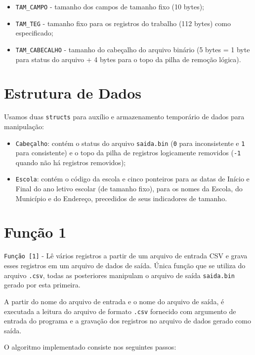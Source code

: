 \documentclass[
	12pt,				%
	openany,			%
	twoside,			%
	a4paper,			%
	english,			%
	french,				%
	spanish,			%
	brazil,				%
]{abntex2}
\begin{document}
		\begin{itemize}
			\item \verb|TAM_CAMPO| - tamanho dos campos de tamanho fixo (10 bytes);
			\item \verb|TAM_TEG| - tamanho fixo para os registros do trabalho (112 bytes) como especificado;
			\item \verb|TAM_CABECALHO| - tamanho do cabeçalho do arquivo binário (5 bytes = 1 byte para status do arquivo + 4 bytes para o topo da pilha de remoção lógica).
		\end{itemize}

	\section{Estrutura de Dados}

	Usamos duas \verb|structs| para auxílio e armazenamento temporário de dados para manipulação:

	\begin{itemize}
		\item  \verb|Cabeçalho|: contém  o status do arquivo \verb|saida.bin| (\verb|0| para inconsistente e \verb|1| para consistente) e o topo da pilha de registros logicamente removidos (\verb|-1| quando não há registros removidos);
		\item \verb|Escola|: contém o código da escola e cinco ponteiros para as datas de Início e Final do ano letivo escolar (de tamanho fixo),  para os nomes da Escola, do Município e do Endereço, precedidos de seus indicadores de tamanho.
	\end{itemize}

	\section{Função 1}

		\verb|Função [1]| - Lê vários registros a partir de um arquivo de entrada CSV e grava esses registros em um arquivo de dados de saída. Única função que se utiliza do arquivo \verb|.csv|, todas as posteriores manipulam o arquivo de saída \verb|saida.bin| gerado por esta primeira.

		A partir do nome do arquivo de entrada e o nome do arquivo de saída, é executada a leitura do arquivo de formato \verb|.csv| fornecido com argumento de entrada do programa e a gravação dos registros no arquivo de dados gerado como saída.

		O algoritmo implementado consiste nos seguintes passos:
\end{document}
